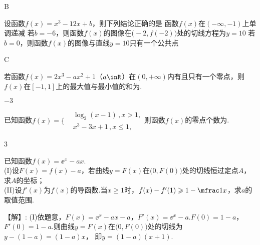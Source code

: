 \begin{exercise}
\begin{answer}
      B
    \end{answer}
  \item %
    设函数$f(x)=x^3-12x+b$，则下列结论正确的是\xz
     {函数$f(x)$在$(-\infty,-1)$上单调递减}
     {若$b=-6$，则函数$f(x)$的图像在$\bigl(-2,f(-2)\bigr)$处的切线方程为$y=10$}
     {若$b=0$，则函数$f(x)$的图像与直线$y=10$只有一个公共点}
    \begin{answer}
      C
    \end{answer}
  \item %
    若函数$f(x)=2x^3-ax^2+1$（$a\inR$）在$(0,+\infty)$内有且只有一个零点，则$f(x)$在$[-1,1]$上的最大值与最小值的和为\tk.
    \begin{answer}
      $-3$
    \end{answer}
  \item %
    已知函数$f(x)=\Bigg\{\begin{aligned}
      &\log_2(x-1)\,,x>1,\\
      &x^3-3x+1\,,x\leqslant1,
    \end{aligned}$则函数$f(x)$的零点个数为\tk.
    \begin{answer}
      3
    \end{answer}
  \item %
    已知函数$f(x)=\ee^x-ax$.\\
    (I)设$F(x)=f(x)-a$，若曲线$y=F(x)$在$\bigl(0,F(0)\bigr)$处的切线恒过定点$A$，求$A$的坐标；\\
    (II)设$f'(x)$为$f(x)$的导函数.当$x\geqslant1$时，$f(x)-f'(1)\geqslant1-\mfrac1x$，求$a$的取值范围.
    \begin{answer}
      【解】:
      (I)依题意，$F(x)=\ee^x-ax-a$，$F'(x)=\ee^x-a$.\fz[1]
         $F(0)=1-a$，$F'(0)=1-a$.\fz[2]
         则曲线$y=F(x)$在$\bigl(0,F(0)\bigr)$处的切线为$y-(1-a)=(1-a)x$，
         即$y=(1-a)(x+1)$.\fz[3]

\end{answer}
\end{exercise}
